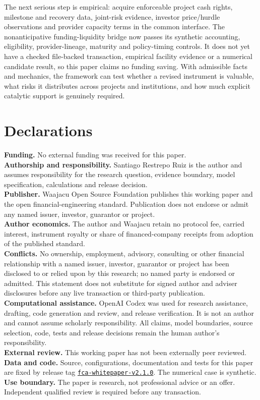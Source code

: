 \documentclass[11pt,a4paper]{article}
\begin{document}
The next serious step is empirical: acquire enforceable project cash rights, milestone and recovery data, joint-risk evidence, investor price/hurdle observations and provider capacity terms in the common interface. The nonanticipative funding-liquidity bridge now passes its synthetic accounting, eligibility, provider-lineage, maturity and policy-timing controls. It does not yet have a checked file-backed transaction, empirical facility evidence or a numerical candidate result, so this paper claims no funding saving. With admissible facts and mechanics, the framework can test whether a revised instrument is valuable, what risks it distributes across projects and institutions, and how much explicit catalytic support is genuinely required.

\clearpage
\section*{Declarations}

\textbf{Funding.} No external funding was received for this paper.\\
\textbf{Authorship and responsibility.} Santiago Restrepo Ruiz is the author and assumes responsibility for the research question, evidence boundary, model specification, calculations and release decision.\\
\textbf{Publisher.} Waajacu Open Source Foundation publishes this working paper and the open financial-engineering standard. Publication does not endorse or admit any named issuer, investor, guarantor or project.\\
\textbf{Author economics.} The author and Waajacu retain no protocol fee, carried interest, instrument royalty or share of financed-company receipts from adoption of the published standard.\\
\textbf{Conflicts.} No ownership, employment, advisory, consulting or other financial relationship with a named issuer, investor, guarantor or project has been disclosed to or relied upon by this research; no named party is endorsed or admitted. This statement does not substitute for signed author and adviser disclosures before any live transaction or third-party publication.\\
\textbf{Computational assistance.} OpenAI Codex was used for research assistance, drafting, code generation and review, and release verification. It is not an author and cannot assume scholarly responsibility. All claims, model boundaries, source selection, code, tests and release decisions remain the human author's responsibility.\\
\textbf{External review.} This working paper has not been externally peer reviewed.\\
\textbf{Data and code.} Source, configurations, documentation and tests for this paper are fixed by release tag \href{https://github.com/savethebeesandseeds/naturalehia/tree/fca-whitepaper-v2.1.0/projects/fostering-cellular-agriculture}{\texttt{fca-whitepaper-v2.1.0}}. The numerical case is synthetic.\\
\textbf{Use boundary.} The paper is research, not professional advice or an offer. Independent qualified review is required before any transaction.
\end{document}
